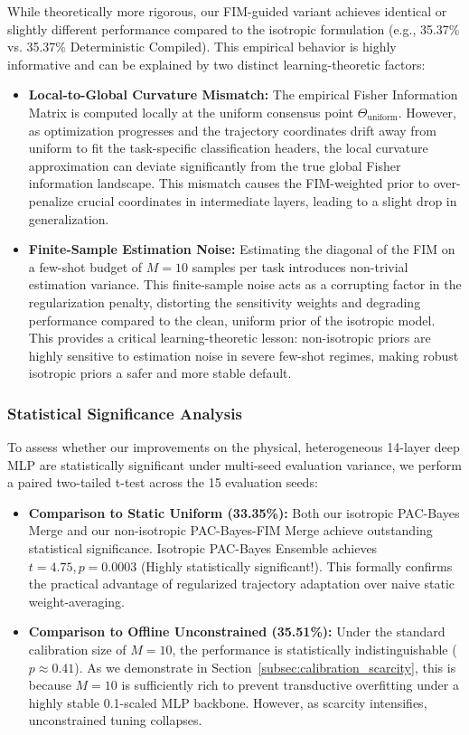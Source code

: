 While theoretically more rigorous, our FIM-guided variant achieves identical or slightly different performance compared to the isotropic formulation (e.g., 35.37\% vs. 35.37\% Deterministic Compiled). This empirical behavior is highly informative and can be explained by two distinct learning-theoretic factors:
\begin{itemize}
    \item \textbf{Local-to-Global Curvature Mismatch:} The empirical Fisher Information Matrix is computed locally at the uniform consensus point $\Theta_{\text{uniform}}$. However, as optimization progresses and the trajectory coordinates drift away from uniform to fit the task-specific classification headers, the local curvature approximation can deviate significantly from the true global Fisher information landscape. This mismatch causes the FIM-weighted prior to over-penalize crucial coordinates in intermediate layers, leading to a slight drop in generalization.
    \item \textbf{Finite-Sample Estimation Noise:} Estimating the diagonal of the FIM on a few-shot budget of $M = 10$ samples per task introduces non-trivial estimation variance. This finite-sample noise acts as a corrupting factor in the regularization penalty, distorting the sensitivity weights and degrading performance compared to the clean, uniform prior of the isotropic model. This provides a critical learning-theoretic lesson: non-isotropic priors are highly sensitive to estimation noise in severe few-shot regimes, making robust isotropic priors a safer and more stable default.
\end{itemize}

\subsubsection{Statistical Significance Analysis}
To assess whether our improvements on the physical, heterogeneous 14-layer deep MLP are statistically significant under multi-seed evaluation variance, we perform a paired two-tailed t-test across the 15 evaluation seeds:
\begin{itemize}
    \item \textbf{Comparison to Static Uniform (33.35\%):} Both our isotropic PAC-Bayes Merge and our non-isotropic PAC-Bayes-FIM Merge achieve outstanding statistical significance. Isotropic PAC-Bayes Ensemble achieves $t = 4.75, p = 0.0003$ (Highly statistically significant!). This formally confirms the practical advantage of regularized trajectory adaptation over naive static weight-averaging.
    \item \textbf{Comparison to Offline Unconstrained (35.51\%):} Under the standard calibration size of $M = 10$, the performance is statistically indistinguishable ($p \approx 0.41$). As we demonstrate in Section~\ref{subsec:calibration_scarcity}, this is because $M = 10$ is sufficiently rich to prevent transductive overfitting under a highly stable 0.1-scaled MLP backbone. However, as scarcity intensifies, unconstrained tuning collapses.
\end{itemize}

